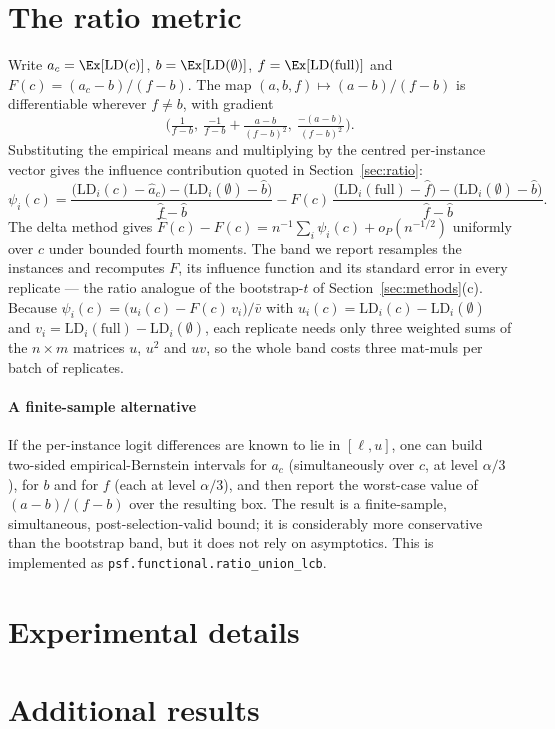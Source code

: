 \section{The ratio metric}
\label{app:ratio}

Write $a_c=\Ex[\mathrm{LD}(c)]$, $b=\Ex[\mathrm{LD}(\emptyset)]$,
$f=\Ex[\mathrm{LD}(\text{full})]$ and $F(c)=(a_c-b)/(f-b)$. The map
$(a,b,f)\mapsto(a-b)/(f-b)$ is differentiable wherever $f\ne b$, with gradient
\[
\Big(\tfrac{1}{f-b},\ \tfrac{-1}{f-b}+\tfrac{a-b}{(f-b)^2},\ \tfrac{-(a-b)}{(f-b)^2}\Big).
\]
Substituting the empirical means and multiplying by the centred per-instance
vector gives the influence contribution quoted in Section~\ref{sec:ratio}:
\[
\psi_i(c)=\frac{\big(\mathrm{LD}_i(c)-\hat a_c\big)-\big(\mathrm{LD}_i(\emptyset)-\hat b\big)}{\hat f-\hat b}
-\hat F(c)\,\frac{\big(\mathrm{LD}_i(\text{full})-\hat f\big)-\big(\mathrm{LD}_i(\emptyset)-\hat b\big)}{\hat f-\hat b}.
\]
The delta method gives $\hat F(c)-F(c)=n^{-1}\sum_i\psi_i(c)+o_P(n^{-1/2})$
uniformly over $c$ under bounded fourth moments. The band we report resamples
the instances and recomputes $F$, its influence function and its standard error
in every replicate --- the ratio analogue of the bootstrap-$t$ of
Section~\ref{sec:methods}(c). Because
$\psi_i(c) = \big(u_i(c) - F(c)\,v_i\big)/\bar v$ with
$u_i(c)=\mathrm{LD}_i(c)-\mathrm{LD}_i(\emptyset)$ and
$v_i=\mathrm{LD}_i(\text{full})-\mathrm{LD}_i(\emptyset)$, each replicate needs
only three weighted sums of the $n\times m$ matrices $u$, $u^2$ and $uv$, so the
whole band costs three mat-muls per batch of replicates.

\paragraph{A finite-sample alternative}
If the per-instance logit differences are known to lie in $[\ell,u]$, one can
build two-sided empirical-Bernstein intervals for $a_c$ (simultaneously over $c$,
at level $\alpha/3$), for $b$ and for $f$ (each at level $\alpha/3$), and then
report the worst-case value of $(a-b)/(f-b)$ over the resulting box. The result
is a finite-sample, simultaneous, post-selection-valid bound; it is considerably
more conservative than the bootstrap band, but it does not rely on asymptotics.
This is implemented as \texttt{psf.functional.ratio\_union\_lcb}.

\section{Experimental details}
\label{app:details}



\section{Additional results}
\label{app:extra}





